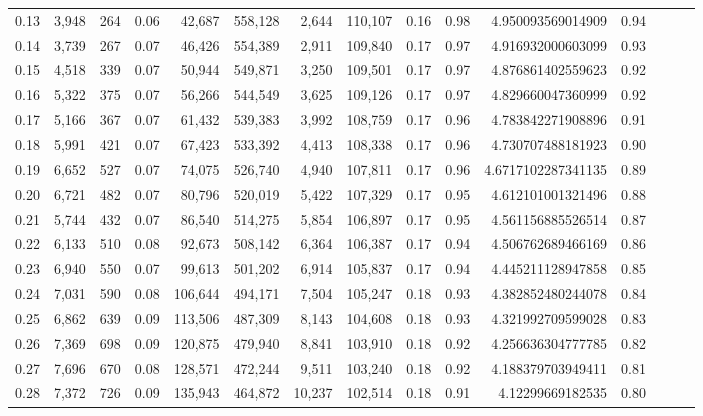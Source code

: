 \begin{tabular}{rrrrrrrrrrrrrrr}
0.13 &   3,948 &    264 &  0.06 &   42,687 &  558,128 &    2,644 &  110,107 &  0.16 &  0.98 &     4.950093569014909 &      0.94 \\
0.14 &   3,739 &    267 &  0.07 &   46,426 &  554,389 &    2,911 &  109,840 &  0.17 &  0.97 &     4.916932000603099 &      0.93 \\
0.15 &   4,518 &    339 &  0.07 &   50,944 &  549,871 &    3,250 &  109,501 &  0.17 &  0.97 &     4.876861402559623 &      0.92 \\
0.16 &   5,322 &    375 &  0.07 &   56,266 &  544,549 &    3,625 &  109,126 &  0.17 &  0.97 &     4.829660047360999 &      0.92 \\
0.17 &   5,166 &    367 &  0.07 &   61,432 &  539,383 &    3,992 &  108,759 &  0.17 &  0.96 &     4.783842271908896 &      0.91 \\
0.18 &   5,991 &    421 &  0.07 &   67,423 &  533,392 &    4,413 &  108,338 &  0.17 &  0.96 &     4.730707488181923 &      0.90 \\
0.19 &   6,652 &    527 &  0.07 &   74,075 &  526,740 &    4,940 &  107,811 &  0.17 &  0.96 &    4.6717102287341135 &      0.89 \\
0.20 &   6,721 &    482 &  0.07 &   80,796 &  520,019 &    5,422 &  107,329 &  0.17 &  0.95 &     4.612101001321496 &      0.88 \\
0.21 &   5,744 &    432 &  0.07 &   86,540 &  514,275 &    5,854 &  106,897 &  0.17 &  0.95 &     4.561156885526514 &      0.87 \\
0.22 &   6,133 &    510 &  0.08 &   92,673 &  508,142 &    6,364 &  106,387 &  0.17 &  0.94 &     4.506762689466169 &      0.86 \\
0.23 &   6,940 &    550 &  0.07 &   99,613 &  501,202 &    6,914 &  105,837 &  0.17 &  0.94 &     4.445211128947858 &      0.85 \\
0.24 &   7,031 &    590 &  0.08 &  106,644 &  494,171 &    7,504 &  105,247 &  0.18 &  0.93 &     4.382852480244078 &      0.84 \\
0.25 &   6,862 &    639 &  0.09 &  113,506 &  487,309 &    8,143 &  104,608 &  0.18 &  0.93 &     4.321992709599028 &      0.83 \\
0.26 &   7,369 &    698 &  0.09 &  120,875 &  479,940 &    8,841 &  103,910 &  0.18 &  0.92 &     4.256636304777785 &      0.82 \\
0.27 &   7,696 &    670 &  0.08 &  128,571 &  472,244 &    9,511 &  103,240 &  0.18 &  0.92 &     4.188379703949411 &      0.81 \\
0.28 &   7,372 &    726 &  0.09 &  135,943 &  464,872 &   10,237 &  102,514 &  0.18 &  0.91 &      4.12299669182535 &      0.80 \\

\end{tabular}
